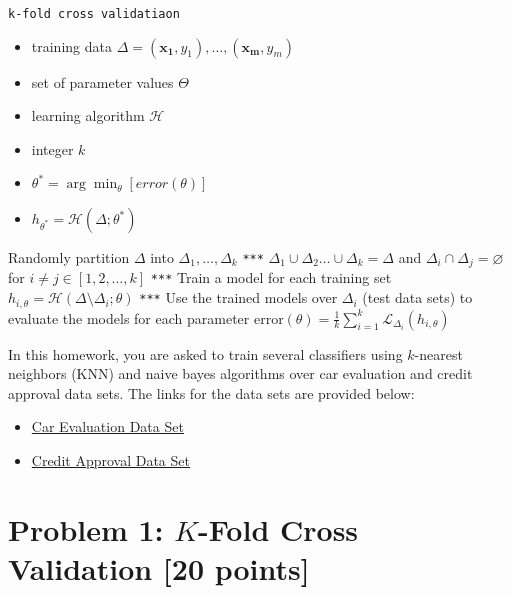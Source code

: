 \documentclass{article}
\newcommand{\argmin}{\arg\!\min}
\begin{document}
{\small
\begin{center}
\begin{algorithmic}[1]\label{alg:crossValidation}
 \texttt{k-fold cross validatiaon}
 \begin{itemize}
\item \textsf{training data} $\Delta = (\mathbf{x_1},y_1),\ldots,(\mathbf{x_m},y_m)$
\item  set of parameter values $\Theta$
\item  learning algorithm $\mathcal{H}$
\item  integer $k$
\end{itemize}
\begin{itemize}
\item $\theta^* =\argmin_\theta [error(\theta)]$
\item $h_{\theta^*} = \mathcal{H}(\Delta;\theta^*)$ 
\end{itemize}
\State Randomly partition $\Delta$ into $\Delta_1,\ldots,\Delta_k$
\State  \texttt{***} $\Delta_1\cup\Delta_2\ldots \cup\Delta_k = \Delta$ and $\Delta_i \cap \Delta_j = \varnothing$ for $i \neq j \in [1,2,\ldots,k]$
\For{$\theta \in \Theta$}
\State  \texttt{***}  \textsf{Train a model for each training set}
\State $h_{i,\theta} = \mathcal{H}(\Delta \setminus \Delta_i;\theta)$
\EndFor
\State  \texttt{***}  \textsf{Use the trained models over $\Delta_i$ (test data sets) to evaluate the models for each parameter}
\State error$(\theta)= \frac{1}{k} \sum_{i=1}^{k} \mathcal{L}_{\Delta_i} (h_{i,\theta})$
\EndFor
\end{algorithmic}
\end{center}}
In this homework, you are asked to train several classifiers  using $k$-nearest neighbors (KNN) and  naive bayes  algorithms over  car evaluation and credit approval data sets.  The links for the data sets are provided below:
  
 \begin{itemize}
\item \href{https://archive.ics.uci.edu/ml/datasets/car+evaluation}{Car Evaluation Data Set}
\item \href{https://archive.ics.uci.edu/ml/datasets/Credit+Approval}{Credit Approval Data Set }
\end{itemize}

\section*{Problem 1: $K$-Fold Cross Validation [20 points]}
\end{document}

